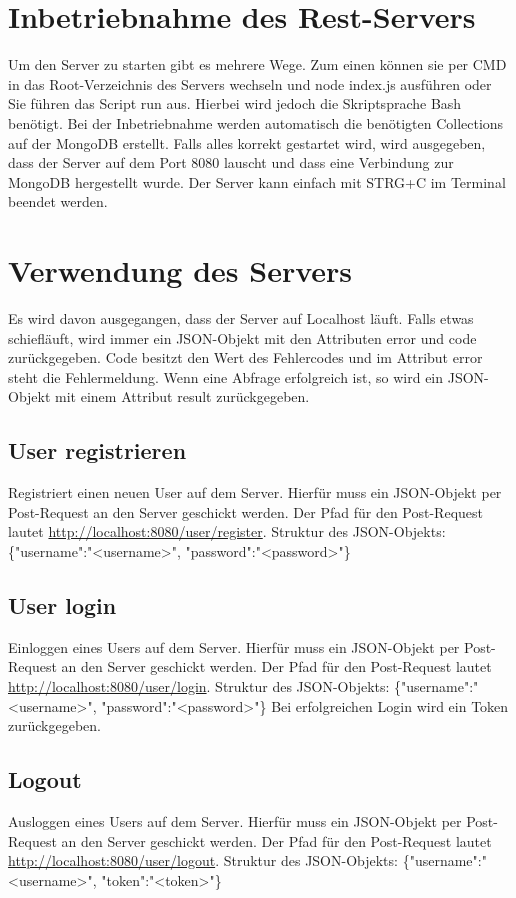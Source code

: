 \documentclass[12pt]{scrartcl}
\begin{document}
    \section{Inbetriebnahme des Rest-Servers}
        Um den Server zu starten gibt es mehrere Wege. 
        Zum einen können sie per CMD in das Root-Verzeichnis des Servers wechseln und node index.js ausführen oder 
        Sie führen das Script run aus. Hierbei wird jedoch die Skriptsprache Bash benötigt.
        Bei der Inbetriebnahme werden automatisch die benötigten Collections auf der MongoDB erstellt. 
        Falls alles korrekt gestartet wird, wird ausgegeben, dass der Server auf dem Port 8080 lauscht
        und dass eine Verbindung zur MongoDB hergestellt wurde.
        Der Server kann einfach mit STRG+C im Terminal beendet werden.    
    \section{Verwendung des Servers}
        Es wird davon ausgegangen, dass der Server auf Localhost läuft.
        Falls etwas schiefläuft, wird immer ein JSON-Objekt mit den Attributen error und code zurückgegeben.
        Code besitzt den Wert des Fehlercodes und im Attribut error steht die Fehlermeldung.
        Wenn eine Abfrage erfolgreich ist, so wird ein JSON-Objekt mit einem Attribut result zurückgegeben.
    \subsection{User registrieren}
        Registriert einen neuen User auf dem Server.
        Hierfür muss ein JSON-Objekt per Post-Request an den Server geschickt werden. Der Pfad für den Post-Request lautet
        \url{http://localhost:8080/user/register}.
        Struktur des JSON-Objekts: \{"username":"<username>", "password":"<password>"\}

    \subsection{User login}
        Einloggen eines Users auf dem Server.
        Hierfür muss ein JSON-Objekt per Post-Request an den Server geschickt werden. Der Pfad für den Post-Request lautet
        \url{http://localhost:8080/user/login}.
        Struktur des JSON-Objekts: \{"username":"<username>", "password":"<password>"\}
        Bei erfolgreichen Login wird ein Token zurückgegeben. 
    
    \subsection{Logout}
        Ausloggen eines Users auf dem Server.
        Hierfür muss ein JSON-Objekt per Post-Request an den Server geschickt werden. Der Pfad für den Post-Request lautet
        \url{http://localhost:8080/user/logout}.
        Struktur des JSON-Objekts: \{"username":"<username>", "token":"<token>"\}
\end{document}
